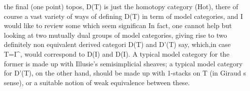 the final (one point) topos,  D(T) is just the homotopy category
(Hot), there   of course a vast variety of ways of defining D(T) in term
of model categories, and I would like to review some which seem significan
In fact, one cannot help but looking at two mutually dual groups of model
categories, giving rise to  two definitely non equivalent derived categori
D(T) and D'(T) say, which,in case T=I\^{}, would correspond to D(I) and
D(I). A typical model category for the former  is made up with
Illusie's semisimplicial sheaves; a typical model category for 
D'(T), on the other hand, should be made up with 1-stacks on T (in Giraud
s sense), or a suitable notion of weak equivalence between these.

